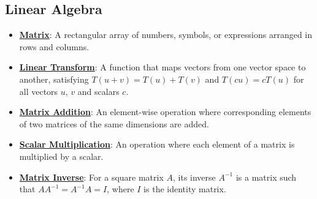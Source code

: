\documentclass{article}%
\begin{document}
\subsection{Linear Algebra}%
\label{subsec:LinearAlgebra}%
\begin{itemize}[leftmargin=*]%
\item \href{https://purdue.brightspace.com/d2l/common/assets/pdfjs-d2l-dist/1.0.14-legacy/web/viewer.html?file=\%2Fcontent\%2Fenforced\%2F1095467-wl.202510.CS.24300.001\%2F04L1-Linear Algebra Primer.pdf\%3Fou\%3D1095467\&lang=en-us\&container=d2l-fileviewer-rendered-pdf\&fullscreen=d2l-fileviewer-rendered-pdf-dialog\&height=667#page=4}{\textbf{Matrix}}: A rectangular array of numbers, symbols, or expressions arranged in rows and columns.%
\item \href{https://purdue.brightspace.com/d2l/common/assets/pdfjs-d2l-dist/1.0.14-legacy/web/viewer.html?file=\%2Fcontent\%2Fenforced\%2F1095467-wl.202510.CS.24300.001\%2F04L1-Linear Algebra Primer.pdf\%3Fou\%3D1095467\&lang=en-us\&container=d2l-fileviewer-rendered-pdf\&fullscreen=d2l-fileviewer-rendered-pdf-dialog\&height=667#page=5}{\textbf{Linear Transform}}: A function that maps vectors from one vector space to another, satisfying $T(u + v) = T(u) + T(v)$ and $T(cu) = cT(u)$ for all vectors $u$, $v$ and scalars $c$.%
\item \href{https://purdue.brightspace.com/d2l/common/assets/pdfjs-d2l-dist/1.0.14-legacy/web/viewer.html?file=\%2Fcontent\%2Fenforced\%2F1095467-wl.202510.CS.24300.001\%2F04L1-Linear Algebra Primer.pdf\%3Fou\%3D1095467\&lang=en-us\&container=d2l-fileviewer-rendered-pdf\&fullscreen=d2l-fileviewer-rendered-pdf-dialog\&height=667#page=9}{\textbf{Matrix Addition}}: An element-wise operation where corresponding elements of two matrices of the same dimensions are added.%
\item \href{https://purdue.brightspace.com/d2l/common/assets/pdfjs-d2l-dist/1.0.14-legacy/web/viewer.html?file=\%2Fcontent\%2Fenforced\%2F1095467-wl.202510.CS.24300.001\%2F04L1-Linear Algebra Primer.pdf\%3Fou\%3D1095467\&lang=en-us\&container=d2l-fileviewer-rendered-pdf\&fullscreen=d2l-fileviewer-rendered-pdf-dialog\&height=667#page=9}{\textbf{Scalar Multiplication}}: An operation where each element of a matrix is multiplied by a scalar.%
\item \href{https://purdue.brightspace.com/d2l/common/assets/pdfjs-d2l-dist/1.0.14-legacy/web/viewer.html?file=\%2Fcontent\%2Fenforced\%2F1095467-wl.202510.CS.24300.001\%2F04L1-Linear Algebra Primer.pdf\%3Fou\%3D1095467\&lang=en-us\&container=d2l-fileviewer-rendered-pdf\&fullscreen=d2l-fileviewer-rendered-pdf-dialog\&height=667#page=10}{\textbf{Matrix Inverse}}: For a square matrix $A$, its inverse $A^{-1}$ is a matrix such that $AA^{-1} = A^{-1}A = I$, where $I$ is the identity matrix.%

\end{itemize}
\end{document}
